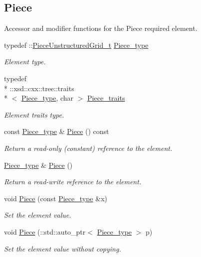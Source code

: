 \subsection*{Piece}
\label{_amgrpa5d512bf83495b68d0ffa20f79804dfc}%
Accessor and modifier functions for the Piece required element. \begin{DoxyCompactItemize}
\item 
typedef \+::\hyperlink{classPieceUnstructuredGrid__t}{Piece\+Unstructured\+Grid\+\_\+t} \hyperlink{classUnstructuredGrid__t_a559913611314b34f4868027fc91e35bc}{Piece\+\_\+type}
\begin{DoxyCompactList}\small\item\em Element type. \end{DoxyCompactList}\item 
typedef \\*
\+::xsd\+::cxx\+::tree\+::traits\\*
$<$ \hyperlink{classUnstructuredGrid__t_a559913611314b34f4868027fc91e35bc}{Piece\+\_\+type}, char $>$ \hyperlink{classUnstructuredGrid__t_a8a9bf012c364a5fbb78aac9a319a4dad}{Piece\+\_\+traits}
\begin{DoxyCompactList}\small\item\em Element traits type. \end{DoxyCompactList}\item 
const \hyperlink{classUnstructuredGrid__t_a559913611314b34f4868027fc91e35bc}{Piece\+\_\+type} \& \hyperlink{classUnstructuredGrid__t_a32fdd47d79cfdd2eb071cf674b7cc9ee}{Piece} () const 
\begin{DoxyCompactList}\small\item\em Return a read-\/only (constant) reference to the element. \end{DoxyCompactList}\item 
\hyperlink{classUnstructuredGrid__t_a559913611314b34f4868027fc91e35bc}{Piece\+\_\+type} \& \hyperlink{classUnstructuredGrid__t_a66b7c6fc204fdc78b4611fd132771573}{Piece} ()
\begin{DoxyCompactList}\small\item\em Return a read-\/write reference to the element. \end{DoxyCompactList}\item 
void \hyperlink{classUnstructuredGrid__t_a97ef3f79738631a4265c4fbeb170f04d}{Piece} (const \hyperlink{classUnstructuredGrid__t_a559913611314b34f4868027fc91e35bc}{Piece\+\_\+type} \&x)
\begin{DoxyCompactList}\small\item\em Set the element value. \end{DoxyCompactList}\item 
void \hyperlink{classUnstructuredGrid__t_aadd93b1b259778a8ef49c3d6e5b0be5d}{Piece} (\+::std\+::auto\+\_\+ptr$<$ \hyperlink{classUnstructuredGrid__t_a559913611314b34f4868027fc91e35bc}{Piece\+\_\+type} $>$ p)
\begin{DoxyCompactList}\small\item\em Set the element value without copying. \end{DoxyCompactList}\end{DoxyCompactItemize}
